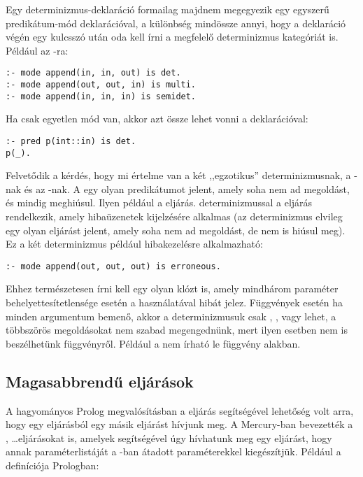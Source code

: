 Egy determinizmus-deklaráció formailag majdnem megegyezik egy egyszerű predikátum-mód
deklarációval, a különbség mindössze annyi, hogy a deklaráció végén egy  kulcsszó
után oda kell írni a megfelelő determinizmus kategóriát is. Például az -ra:

\begin{verbatim}
:- mode append(in, in, out) is det.
:- mode append(out, out, in) is multi.
:- mode append(in, in, in) is semidet.
\end{verbatim}

Ha csak egyetlen mód van, akkor azt össze lehet vonni a  deklarációval:

\begin{verbatim}
:- pred p(int::in) is det.
p(_).
\end{verbatim}

Felvetődik a kérdés, hogy mi értelme van a két ,,egzotikus'' determinizmusnak, a
-nak és az -nak. A  egy olyan predikátumot
jelent, amely soha nem ad megoldást, és mindig meghiúsul. Ilyen például a 
eljárás.  determinizmussal a  eljárás rendelkezik,
amely hibaüzenetek kijelzésére alkalmas (az  determinizmus elvileg egy
olyan eljárást jelent, amely soha nem ad megoldást, de nem is hiúsul meg). Ez a két
determinizmus például hibakezelésre alkalmazható:

\begin{verbatim}
:- mode append(out, out, out) is erroneous.
\end{verbatim}

Ehhez természetesen írni kell egy olyan klózt is, amely mindhárom paraméter
behelyettesítetlensége esetén a  használatával hibát jelez.
\br
Függvények esetén ha minden argumentum bemenő, akkor a determinizmusuk csak
, ,  vagy  lehet, a többszörös
megoldásokat nem szabad megengednünk, mert ilyen esetben nem is beszélhetünk
függvényről. Például a  nem írható le függvény alakban.


\subsection{Magasabbrendű eljárások}

A hagyományos Prolog megvalósításban a  eljárás segítségével lehetőség
volt arra, hogy egy eljárásból egy másik eljárást hívjunk meg. A Mercury-ban
bevezették a ,  \ldots eljárásokat is, amelyek segítségével
úgy hívhatunk meg egy eljárást, hogy annak paraméterlistáját a -ban
átadott paraméterekkel kiegészítjük. Például a  definíciója Prologban:

